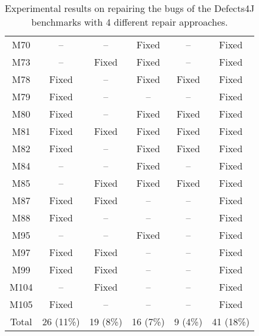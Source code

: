 \begin{table}[!t]
{\begin{tabular}{|c|c|c|c|c|c|}
M70    & --      & --     & Fixed   & --   & Fixed\\
M73    & --      & Fixed  & Fixed   & --   & Fixed\\
M78    & Fixed   & --     & Fixed   & Fixed & Fixed\\
M79    & Fixed   & --     & --      & --   & Fixed\\
M80    & Fixed   & --     & Fixed   & Fixed & Fixed\\
M81    & Fixed   & Fixed  & Fixed   & Fixed & Fixed\\
M82    & Fixed   & --     & Fixed   & Fixed & Fixed\\
M84    & --      & --     & Fixed   & --   & Fixed\\
M85    & --      & Fixed  & Fixed   & Fixed & Fixed\\
M87    & Fixed   & Fixed  & --      & --   & Fixed\\
M88    & Fixed   & --     & --      & --   & Fixed\\
M95    & --      & --     & Fixed   & --   & Fixed\\
M97    & Fixed   & Fixed  & --      & --   & Fixed\\
M99    & Fixed   & Fixed  & --      & --   & Fixed\\
M104   & --      & Fixed  & --      & --   & Fixed\\
M105   & Fixed   & --     & --      & --   & Fixed\\
\hline
\hline
Total  & 26 (11\%) & 19 (8\%) & 16 (7\%) & 9 (4\%) & 41 (18\%)\\
\hline 
\end{tabular}%
}
\caption{Experimental results on repairing the bugs of the Defects4J benchmarks with 4 different repair approaches.}
\end{table}
